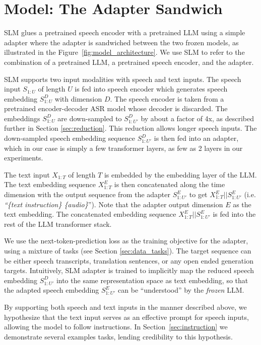 \section{Model: The Adapter Sandwich}
\label{sec:adapter}
SLM glues a pretrained speech encoder with a pretrained LLM using a simple adapter where the adapter is sandwiched between the two frozen models, as illustrated in the Figure~\ref{fig:model_architecture}. We use SLM to refer to the combination of a pretrained LLM, a pretrained speech encoder, and the adapter. 

SLM supports two input modalities with speech and text inputs. The speech input $S_{1:U}$ of length $U$ is fed into speech encoder which generates speech embedding $S_{1:U}^{D}$ with dimension $D$. The speech encoder is taken from a pretrained encoder-decoder ASR model whose decoder is discarded. The embeddings $S_{1:U}^{D}$ are down-sampled to $S_{1:U'}^{D}$ by about a factor of 4x, as described further in Section \ref{sec:reduction}. This reduction allows longer speech inputs. The down-sampled speech embedding sequence $S_{1:U'}^{D}$ is then fed into an adapter, which in our case is simply a few transformer layers, as few as 2 layers in our experiments.

The text input $X_{1:T}$ of length $T$ is embedded by the embedding layer of the LLM. The text embedding sequence $X_{1:T}^{E}$ is then concatenated along the time dimension with the output sequence from the adapter $S_{1:U'}^{E}$ to get $X_{1:T}^{E} || S_{1:U'}^{E}$ (i.e. {\em ``\{text instruction\} \{audio\}}''). Note that the adapter output dimension $E$ as the text embedding. The concatenated embedding sequence $X_{1:T}^{E} || S_{1:U'}^{E}$ is fed into the rest of the LLM transformer stack.

We use the next-token-prediction loss as the training objective for the adapter, using a mixture of tasks (see Section \ref{sec:data_tasks}). The target sequence can be either speech transcripts, translation sentences, or any open ended generation targets. Intuitively, SLM adapter is trained to implicitly map the reduced speech embedding $S_{1:U'}^{D}$ into the same representation space as text embedding, so that the adapted speech embedding $S_{1:U'}^{E}$ can be ``understood'' by the {\em frozen} LLM. 

By supporting both speech and text inputs in the manner described above, we hypothesize that the text input serves as an effective prompt for speech inputs, allowing the model to follow instructions. In Section~\ref{sec:instruction} we demonstrate several examples tasks, lending credibility to this hypothesis.

